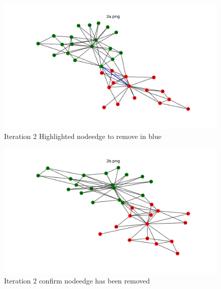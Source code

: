 \documentclass[12pt]{article}
\begin{document}
\begin{figure}[H]
\centering
\includegraphics[trim=0 0 0 0, clip, width=\textwidth]{ 2a.png}
\caption{Iteration 2 Highlighted nodeedge to remove in blue }
\label{fig:q12a}
\end{figure}
\begin{figure}[H]
\centering
\includegraphics[trim=0 0 0 0, clip, width=\textwidth] {2b.png}
\caption{Iteration 2 confirm nodeedge has been removed }
\label{fig:q12b}
\end{figure}
\end{document}
